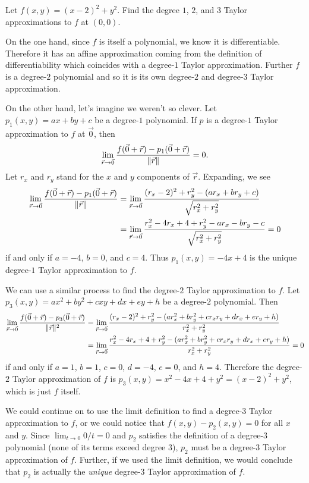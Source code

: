 \begin{example}
	Let $f(x,y)=(x-2)^2+y^2$.  Find the degree $1$, $2$, and $3$ Taylor
	approximations to $f$ at $(0,0)$.

	On the one hand, since $f$ is itself a polynomial, we know it is differentiable.  
	Therefore it has an affine approximation coming from the definition of differentiability
	which coincides with a degree-$1$ Taylor approximation.  Further $f$ is a degree-$2$
	polynomial and so it is its own degree-$2$ and degree-$3$ Taylor approximation.

	On the other hand, let's imagine we weren't so clever.  Let $p_1(x,y)=ax+by+c$
	be a degree-$1$ polynomial.  If $p$ is a degree-$1$ Taylor approximation to $f$
	at $\vec 0$, then
	\[
		\lim_{\vec r\to \vec 0} \frac{f(\vec 0+\vec r)-p_1(\vec 0+\vec r)}{\lVert\vec r\rVert}=0.
	\]
	Let $r_x$ and $r_y$ stand for the $x$ and $y$ components of $\vec r$.
	Expanding, we see
	\begin{align*}
		\lim_{\vec r\to \vec 0} \frac{f(\vec 0+\vec r)-p_1(\vec 0+\vec r)}{\lVert\vec r\rVert}&=
		\lim_{\vec r\to \vec 0} \frac{(r_x-2)^2+r_y^2 -(ar_x+br_y+c)}{\sqrt{r_x^2+r_y^2}}\\
		&=\lim_{\vec r\to \vec 0} \frac{r_x^2-4r_x+4+r_y^2 -ar_x-br_y-c}{\sqrt{r_x^2+r_y^2}}=0
	\end{align*}
	if and only if $a=-4$, $b=0$, and $c=4$.  Thus $p_1(x,y)=-4x+4$ is the unique degree-$1$
	Taylor approximation to $f$.

	We can use a similar process to find the degree-$2$ Taylor approximation to $f$.
	Let $p_3(x,y)=ax^2+by^2+cxy+dx+ey+h$ be a degree-$2$ polynomial.  Then
	\begin{align*}
		\lim_{\vec r\to \vec 0} \frac{f(\vec 0+\vec r)-p_3(\vec 0+\vec r)}{\lVert\vec r\rVert^2}&=
		\lim_{\vec r\to \vec 0} \frac{(r_x-2)^2+r_y^2 -(ar_x^2+br_y^2+cr_xr_y+dr_x+er_y+h)}{r_x^2+r_y^2}\\
		&=\lim_{\vec r\to \vec 0} \frac{r_x^2-4r_x+4+r_y^2 -(ar_x^2+br_y^2+cr_xr_y+dr_x+er_y+h)}{r_x^2+r_y^2}=0
	\end{align*}
	if and only if $a=1$, $b=1$, $c=0$, $d=-4$, $e=0$, and $h=4$.  Therefore
	the degree-$2$ Taylor approximation of $f$ is $p_3(x,y)=x^2-4x+4+y^2=(x-2)^2+y^2$, which
	is just $f$ itself.

	We could continue on to use the limit definition to find a degree-$3$ Taylor
	approximation to $f$, or we could notice that $f(x,y)-p_2(x,y)=0$ for all $x$ and $y$.
	Since $\lim_{t\to0} 0/t=0$ and $p_2$ satisfies the definition of a degree-$3$ polynomial
	(none of its terms exceed degree $3$), $p_2$ must be a degree-$3$ Taylor approximation
	of $f$.  Further, if we used the limit definition, we would conclude that $p_2$ is
	actually the \emph{unique} degree-$3$ Taylor approximation of $f$.
\end{example}


